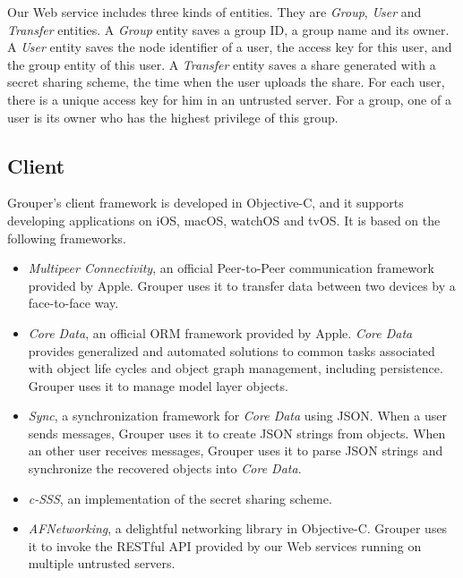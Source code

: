 \documentclass[twocolumn,10pt]{article}
\begin{document}
Our Web service includes three kinds of entities. 
They are \emph{Group}, \emph{User} and \emph{Transfer} entities. 
A \emph{Group} entity saves a group ID, a group name and its owner. 
A \emph{User} entity saves the node identifier of a user, the access key for this user, and the group entity of this user. 
A \emph{Transfer} entity saves a share generated with a secret sharing scheme, the time when the user uploads the share. 
For each user, there is a unique access key for him in an untrusted server. For a group, one of a user is its owner who has the highest privilege of this group.

\subsection{Client}

Grouper's client framework is developed in Objective-C, and it supports developing applications on iOS, macOS, watchOS and tvOS.
It is based on the following frameworks.   

\begin{itemize}
	\setlength{\itemsep}{1pt}
	\setlength{\parskip}{0pt}
	\setlength{\parsep}{0pt}
	\item 
	\emph{Multipeer Connectivity}\cite{mc},  an official Peer-to-Peer communication framework provided by Apple. 
	Grouper uses it to transfer data between two devices by a face-to-face way.
	\item 
	\emph{Core Data}\cite{coredata}, an official ORM framework provided by Apple.
	\emph{Core Data} provides generalized and automated solutions to common tasks associated with object life cycles and object graph management, including persistence. 
	Grouper uses it to manage model layer objects. 
	\item 
	\emph{Sync}\cite{sync}, a synchronization framework for \emph{Core Data} using JSON. 
	When a user sends messages, Grouper uses it to create JSON strings from objects. 
	When an other user receives messages, Grouper uses it to parse JSON strings and synchronize the recovered objects into \emph{Core Data}.
	\item 
	\emph{c-SSS}\cite{c-sss}, an implementation of the secret sharing scheme.
	\item 
	\emph{AFNetworking}\cite{afnetworking}, a delightful networking library in Objective-C. 
	Grouper uses it to invoke the RESTful API provided by our Web services running on multiple untrusted servers. 
\end{itemize}
\end{document}
